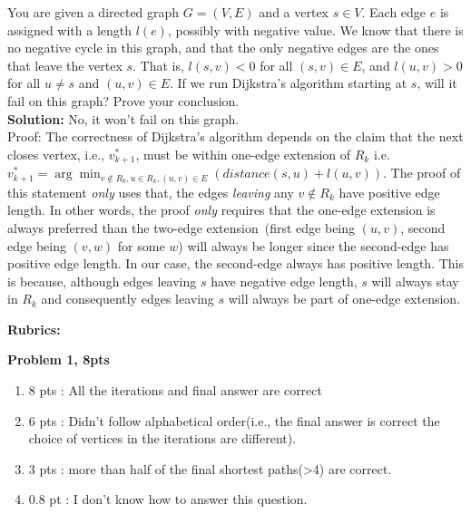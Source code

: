 \documentclass[11pt]{article}
\begin{document}
\begin{qunlist}
 You are given a directed graph $G = (V,E)$ and a vertex $s\in V$. Each edge $e$ is assigned with a length $l(e)$, possibly with negative value. We know that there is no negative cycle in this graph, and that the only negative edges are the ones that leave the vertex $s$. That is, $l(s, v) < 0$ for all $(s, v) \in E$, and $l(u,v) > 0$ for all $u\neq s$ and $(u,v)\in E$. If we run Dijkstra’s algorithm starting at $s$, will it fail on this graph? Prove your conclusion.\\
\textbf{Solution: } No, it won't fail on this graph.\\
Proof: The correctness of Dijkstra's algorithm depends on the claim that the next closes vertex, i.e., $v^*_{k+1}$, must be within one-edge extension of $R_k$ i.e. $v^*_{k+1} = \arg\min_{v\not\in R_k, u\in R_k, (u,v)\in E} (distance(s,u) + l(u,v))$. The proof of this statement \emph{only} uses that, the edges \emph{leaving} any $v\not\in R_k$ have positive edge length. In other words, the proof \emph{only} requires that the one-edge extension is always preferred than the two-edge extension~(first edge being $(u,v)$, second edge being $(v,w)$ for some $w$) will always be longer since the second-edge has positive edge length. In our case, the second-edge always has positive length. This is because, although edges leaving $s$ have negative edge length, $s$ will always stay in $R_k$ and consequently edges leaving $s$ will always be part of one-edge extension. 

\newpage
{\huge {\bf Rubrics:}}

\bigskip

    
{\bf Problem 1, 8pts}
\begin{enumerate}
    \item 8 pts : All the iterations and final answer are correct
    \item 6 pts : Didn't follow alphabetical order(i.e., the final answer is correct the choice of vertices in the iterations are different).
    \item 3 pts : more than half of the final shortest paths(>4) are correct.
    \item 0.8 pt : I don't know how to answer this question.
\end{enumerate}


\end{qunlist}
\end{document}
